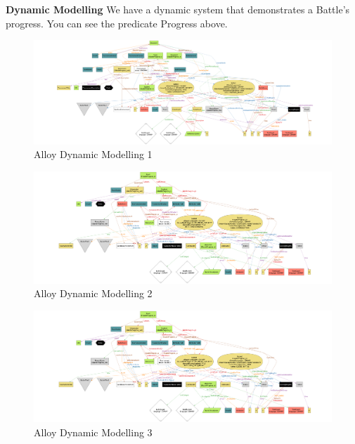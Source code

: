   \newpage
  \textbf{Dynamic Modelling}
  We have a dynamic system that demonstrates  a Battle's progress. You can see the predicate Progress above.
  \\
\begin{figure}[H]
    \centering
    \includegraphics[scale=0.8]{Images/Alloy/Progress_1.png}
    \caption{Alloy Dynamic Modelling 1}
\end{figure}
\begin{figure}[H]
    \centering
    \includegraphics[scale=0.8]{Images/Alloy/Progress_2.png}
    \caption{Alloy Dynamic Modelling 2}
\end{figure}\begin{figure}[H]
    \centering
    \includegraphics[scale=0.8]{Images/Alloy/Progress_3.png}
    \caption{Alloy Dynamic Modelling 3}
\end{figure}
  